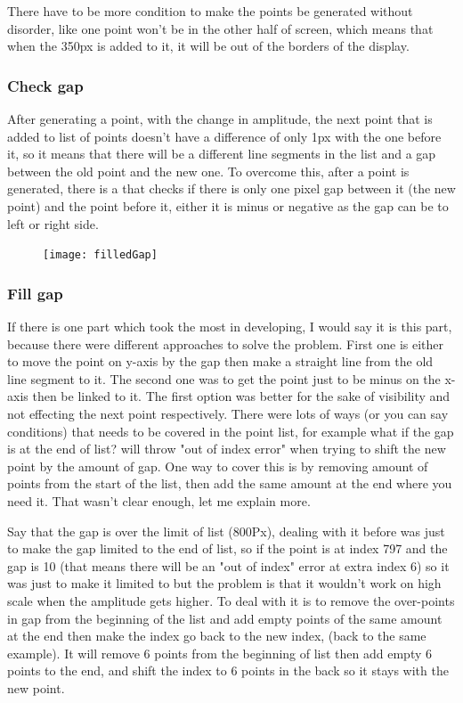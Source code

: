 There have to be more condition to make the points be generated without disorder, like one point won't be in the other half of screen, which means that when the 350px is added to it, it will be out of the borders of the display.


\subsubsection{Check gap}
After generating a point, with the change in amplitude, the next point that is added to list of points doesn't have a difference of only 1px with the one before it, so it means that there will be a different line segments in the list and a gap between the old point and the new one. To overcome this, after a point is generated, there is a  that checks if there is only one pixel gap between it (the new point) and the point before it, either it is minus or negative as the gap can be to left or right side.

\begin{figure}[H]
	\texttt{[image: filledGap]}
\end{figure}

\subsubsection{Fill gap}
If there is one part which took the most in developing, I would say it is this part, because there were different approaches to solve the problem. First one is either to move the point on y-axis by the gap then make a straight line from the old line segment to it. The second one was to get the point just to be minus on the x-axis then be linked to it. The first option was better for the sake of visibility and not effecting the next point respectively. There were lots of ways (or you can say conditions) that needs to be covered in the point list, for example what if the gap is at the end of list?  will throw "out of index error" when trying to shift the new point by the amount of gap. One way to cover this is by removing amount of points from the start of the list, then add the same amount at the end where you need it. That wasn't clear enough, let me explain more.

Say that the gap is over the limit of list (800Px), dealing with it before was just to make the gap limited to the end of list, so if the point is at index 797 and the gap is 10 (that means there will be an "out of index" error at extra index 6) so it was just to make it limited to   but the problem is that it wouldn't work on high scale when the amplitude gets higher.
To deal with it is to remove the over-points in gap from the beginning of the list and add empty points of the same amount at the end then make the index go back to the new index, (back to the same example). It will remove 6 points from the beginning of list then add empty 6 points to the end, and shift the index to 6 points in the back so it stays with the new point.

